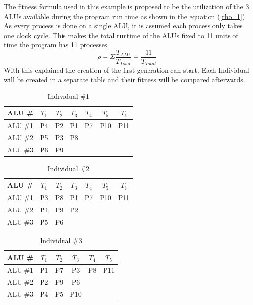 \documentclass[conference]{IEEEtran}
\begin{document}
The fitness formula used in this example is proposed to be the utilization of the 3 ALUs available during the program run time as shown in the equation (\ref{rho_1}). As every process is done on a single ALU, it is assumed each process only takes one clock cycle. This makes the total runtime of the ALUs fixed to 11 units of time the program has 11 processes.
\begin{equation}
    \rho=\Sigma\frac{T_{ALU}}{T_{Total}}=\frac{11}{T_{Total}}
    \label{rho_1}
\end{equation}
With this explained the creation of the first generation can start. Each Individual will be created in a separate table and their fitness will be compared afterwards.
\begin{table}[h!]
    \centering
    \begin{tabular}{|c|c|c|c|c|c|c|}
    \hline
    ALU \#  & $T_1$ & $T_2$ &  $T_3$& $T_4$ & $T_5$ & $T_6$\\
    \hline
       ALU \#1  & P4 & P2 &  P1& P7 & P10 & P11\\
       \hline
       ALU \#2  &  P5 & P3 & P8 &  &  & \\
       \hline
       ALU \#3  & P6 & P9  &  &  &  & \\
       \hline
    \end{tabular}
           \vspace{2pt}
    \caption{Individual \#1}
    \label{tab:Individual1}
\end{table}
\begin{table}[h!]
    \centering
    \begin{tabular}{|c|c|c|c|c|c|c|}
        \hline
    ALU \#  & $T_1$ & $T_2$ &  $T_3$& $T_4$ & $T_5$ & $T_6$\\
    \hline
       ALU \#1  & P3 & P8 &  P1& P7 & P10 & P11\\
       \hline
       ALU \#2  &  P4 & P9 & P2 &  &  & \\
       \hline
       ALU \#3  & P5 & P6  &  &  &  & \\
       \hline
    \end{tabular}
           \vspace{2pt}
    \caption{Individual \#2}
    \label{tab:Individual2}
\end{table}
\begin{table}[h!]
    \centering
    \begin{tabular}{|c|c|c|c|c|c|}
        \hline
    ALU \#  & $T_1$ & $T_2$ &  $T_3$& $T_4$ & $T_5$ \\
    \hline
       ALU \#1  & P1 & P7 &  P3& P8 & P11\\
       \hline
       ALU \#2  &  P2 & P9 & P6 &  &\\
       \hline
       ALU \#3  & P4 & P5  & P10 &  & \\
       \hline
    \end{tabular}
           \vspace{2pt}
    \caption{Individual \#3}
    \label{tab:Individual3}
\end{table}
\end{document}
